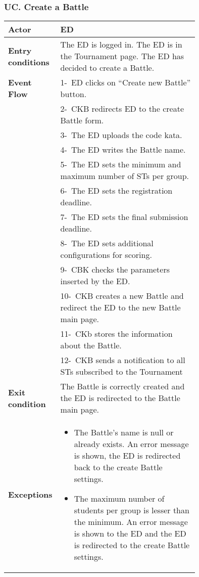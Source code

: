 \subsubsection*{UC\cuc . Create a Battle}
\begin{center}
    \begin{longtable}{|l|p{0.75\linewidth}|}
        \hline
        \textbf{Actor}            & ED \\
        \hline
        \textbf{Entry conditions} & The ED is logged in. The ED is in the Tournament page. The ED has decided to create a Battle.        \\
        \hline
        \textbf{Event Flow}       & 1-\ ED clicks on “Create new Battle” button.        \\
        & 2-\ CKB redirects ED to the create Battle form.        \\
        & 3-\ The ED uploads the code kata.        \\
        & 4-\ The ED writes the Battle name.        \\
        & 5-\ The ED sets the minimum and maximum number of STs per group.        \\
        & 6-\ The ED sets the registration deadline.      \\
        & 7-\ The ED sets the final submission deadline.      \\
        & 8-\ The ED sets additional configurations for scoring.        \\
        & 9-\ CBK checks the parameters inserted by the ED.        \\
        & 10-\ CKB creates a new Battle and redirect the ED to the new Battle main page.        \\
        & 11-\ CKb stores the information about the Battle.        \\
        & 12-\ CKB sends a notification to all STs subscribed to the Tournament         \\
        \hline
        \textbf{Exit condition}   & The Battle is correctly created and the ED is redirected to the Battle main page.        \\
        \hline
        \textbf{Exceptions}        & \begin{itemize}
                \item The Battle’s name is null or already exists. An error message is shown, the ED is redirected back to the create Battle settings.
                \item The maximum number of students per group is lesser than the minimum.  An error message is shown to the ED and the ED is redirected to the create Battle settings.

\end{itemize}
\end{longtable}
\end{center}
